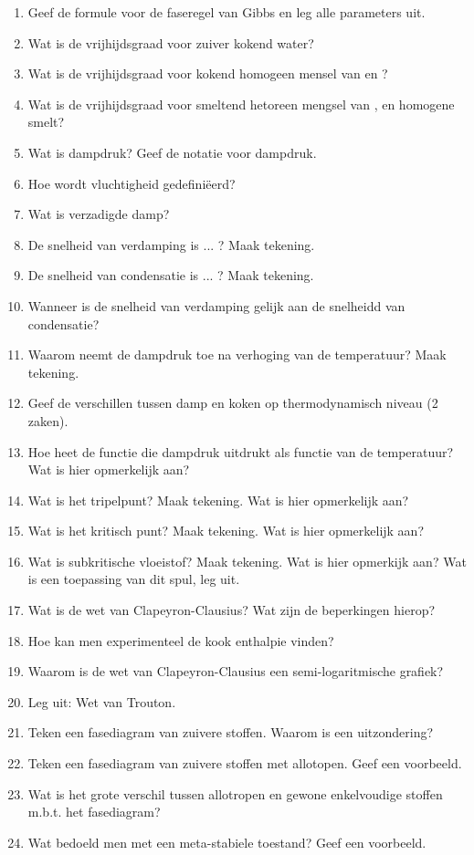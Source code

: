 \documentclass[a4paper,12pt]{article}
\begin{document}
\begin{enumerate}
        \item Geef de formule voor de faseregel van Gibbs en leg alle parameters uit.
        \item Wat is de vrijhijdsgraad voor zuiver kokend water?
        \item Wat is de vrijhijdsgraad voor kokend homogeen mensel van  en ?
        \item Wat is de vrijhijdsgraad voor smeltend hetoreen mengsel van  ,  en homogene smelt?
        \item Wat is dampdruk? Geef de notatie voor dampdruk.
        \item Hoe wordt vluchtigheid gedefini\"eerd?
        \item Wat is verzadigde damp?
        \item De snelheid van verdamping is ... ? Maak tekening.
        \item De snelheid van condensatie is ... ? Maak tekening.
        \item Wanneer is de snelheid van verdamping gelijk aan de snelheidd van condensatie?
        \item Waarom neemt de dampdruk toe na verhoging van de temperatuur? Maak tekening.
        \item Geef de verschillen tussen damp en koken op thermodynamisch niveau (2 zaken).
        \item Hoe heet de functie die dampdruk uitdrukt als functie van de temperatuur? Wat is hier opmerkelijk aan?
        \item Wat is het tripelpunt? Maak tekening. Wat is hier opmerkelijk aan?
        \item Wat is het kritisch punt? Maak tekening. Wat is hier opmerkelijk aan?
        \item Wat is subkritische vloeistof? Maak tekening. Wat is hier opmerkijk aan? Wat is een toepassing van dit spul, leg uit.
        \item Wat is de wet van Clapeyron-Clausius? Wat zijn de beperkingen hierop? 
        \item Hoe kan men experimenteel de kook enthalpie vinden?
        \item Waarom is de wet van Clapeyron-Clausius een semi-logaritmische grafiek?
        \item Leg uit: Wet van Trouton.
        \item Teken een fasediagram van zuivere stoffen. Waarom is  een uitzondering?
        \item Teken een fasediagram van zuivere stoffen met allotopen. Geef een voorbeeld.
        \item Wat is het grote verschil tussen allotropen en gewone enkelvoudige stoffen m.b.t. het fasediagram?
        \item Wat bedoeld men met een meta-stabiele toestand? Geef een voorbeeld.
    \end{enumerate}
\end{document}
